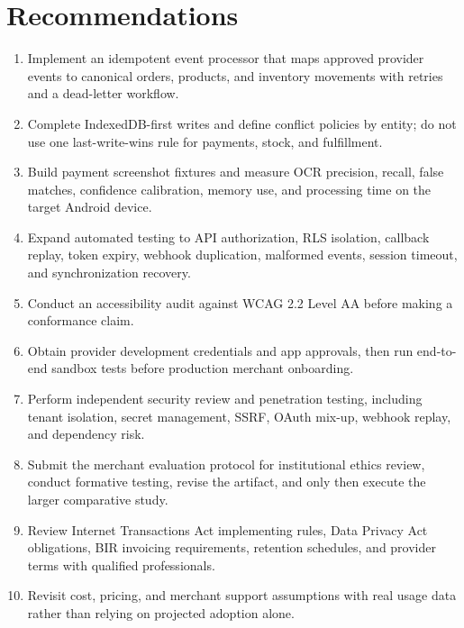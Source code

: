 \documentclass[12pt,oneside]{report}
\begin{document}
\section{Recommendations}
\begin{enumerate}
  \item Implement an idempotent event processor that maps approved provider
  events to canonical orders, products, and inventory movements with retries
  and a dead-letter workflow.
  \item Complete IndexedDB-first writes and define conflict policies by entity;
  do not use one last-write-wins rule for payments, stock, and fulfillment.
  \item Build payment screenshot fixtures and measure OCR precision, recall,
  false matches, confidence calibration, memory use, and processing time on the
  target Android device.
  \item Expand automated testing to API authorization, RLS isolation, callback
  replay, token expiry, webhook duplication, malformed events, session timeout,
  and synchronization recovery.
  \item Conduct an accessibility audit against WCAG 2.2 Level AA before making
  a conformance claim.
  \item Obtain provider development credentials and app approvals, then run
  end-to-end sandbox tests before production merchant onboarding.
  \item Perform independent security review and penetration testing, including
  tenant isolation, secret management, SSRF, OAuth mix-up, webhook replay, and
  dependency risk.
  \item Submit the merchant evaluation protocol for institutional ethics review,
  conduct formative testing, revise the artifact, and only then execute the
  larger comparative study.
  \item Review Internet Transactions Act implementing rules, Data Privacy Act
  obligations, BIR invoicing requirements, retention schedules, and provider
  terms with qualified professionals.
  \item Revisit cost, pricing, and merchant support assumptions with real usage
  data rather than relying on projected adoption alone.
\end{enumerate}

\appendix
\end{document}
